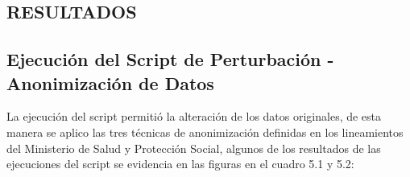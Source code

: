\documentclass[a4paper,openright,12pt]{book}
\theoremstyle{definition}
\theoremstyle{remark}
\begin{document}
\clearpage

\begin{center}
 \chapter{RESULTADOS}\label{cap.resultados}
\end{center}
\section{Ejecución del Script de Perturbación - Anonimización de Datos}
La ejecución del script permitió la alteración de los datos originales, de esta manera se aplico las tres técnicas de anonimización definidas en los lineamientos del Ministerio de Salud y Protección Social, algunos de los resultados de las ejecuciones del script se evidencia en las figuras en el cuadro 5.1  y 5.2:
    
\end{document}
